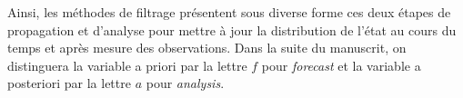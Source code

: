 Ainsi, les méthodes de filtrage présentent sous diverse forme ces deux étapes de propagation et d'analyse pour mettre à jour la distribution de l'état au cours du temps et après mesure des observations. Dans la suite du manuscrit, on distinguera la variable a priori par la lettre $f$ pour \textit{forecast} et la variable a posteriori par la lettre $a$ pour \textit{analysis}.








